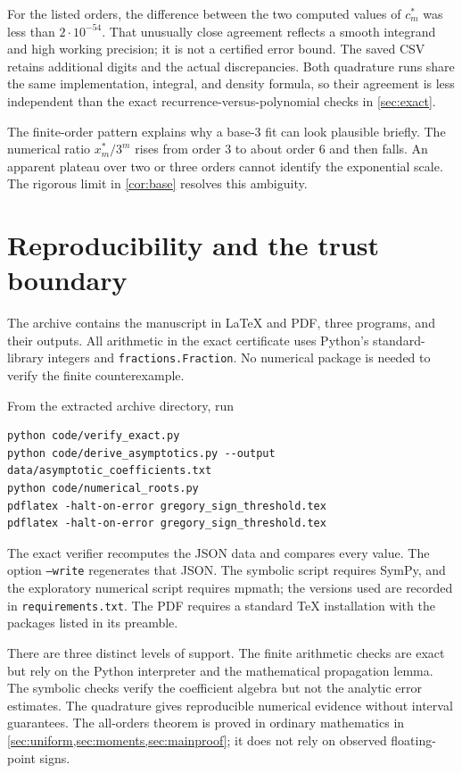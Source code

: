 \documentclass[11pt]{article}
\numberwithin{equation}{section}
\theoremstyle{definition}
\begin{document}
For the listed orders, the difference between the two computed values
of $c_m^*$ was less than $2\cdot10^{-54}$. That unusually close agreement
reflects a smooth integrand and high working precision; it is not a
certified error bound. The saved CSV retains additional digits and the
actual discrepancies. Both quadrature runs share the same implementation,
integral, and density formula, so their agreement is less independent than
the exact recurrence-versus-polynomial checks in \cref{sec:exact}.

The finite-order pattern explains why a base-$3$ fit can look plausible
briefly. The numerical ratio $x_m^*/3^m$ rises from order $3$ to about
order $6$ and then falls. An apparent plateau over two or three orders
cannot identify the exponential scale. The rigorous limit in
\cref{cor:base} resolves this ambiguity.

\section{Reproducibility and the trust boundary}\label{sec:reproduce}

The archive contains the manuscript in \LaTeX{} and PDF, three programs,
and their outputs. All arithmetic in the exact certificate uses Python's
standard-library integers and \texttt{fractions.Fraction}. No numerical
package is needed to verify the finite counterexample.

From the extracted archive directory, run
\begin{lstlisting}
python code/verify_exact.py
python code/derive_asymptotics.py --output data/asymptotic_coefficients.txt
python code/numerical_roots.py
pdflatex -halt-on-error gregory_sign_threshold.tex
pdflatex -halt-on-error gregory_sign_threshold.tex
\end{lstlisting}
The exact verifier recomputes the JSON data and compares every value.
The option \texttt{--write} regenerates that JSON. The symbolic script
requires SymPy, and the exploratory numerical script requires mpmath;
the versions used are recorded in \texttt{requirements.txt}. The PDF
requires a standard \TeX{} installation with the packages listed in its
preamble.

There are three distinct levels of support. The finite arithmetic checks
are exact but rely on the Python interpreter and the mathematical
propagation lemma. The symbolic checks verify the coefficient algebra
but not the analytic error estimates. The quadrature gives reproducible
numerical evidence without interval guarantees. The all-orders theorem
is proved in ordinary mathematics in
\cref{sec:uniform,sec:moments,sec:mainproof}; it does not rely on observed
floating-point signs.
\end{document}
